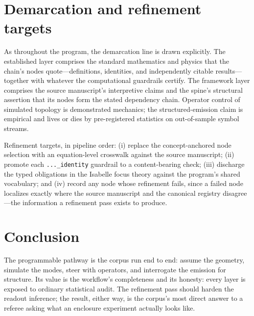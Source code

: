 \documentclass[11pt]{article}
\theoremstyle{remark}
\begin{document}
\section{Demarcation and refinement targets}
\label{sec:demarc}

As throughout the program, the demarcation line is drawn explicitly. The established layer comprises the standard mathematics and physics that the chain's nodes quote---definitions, identities, and independently citable results---together with whatever the computational guardrails certify. The framework layer comprises the source manuscript's interpretive claims and the spine's structural assertion that its nodes form the stated dependency chain. Operator control of simulated topology is demonstrated mechanics; the structured-emission claim is empirical and lives or dies by pre-registered statistics on out-of-sample symbol streams.

Refinement targets, in pipeline order: (i) replace the concept-anchored node selection with an equation-level crosswalk against the source manuscript; (ii) promote each \texttt{...\_identity} guardrail to a content-bearing check; (iii) discharge the typed obligations in the Isabelle focus theory against the program's shared vocabulary; and (iv) record any node whose refinement fails, since a failed node localizes exactly where the source manuscript and the canonical registry disagree---the information a refinement pass exists to produce.

\section{Conclusion}
\label{sec:conc}

The programmable pathway is the corpus run end to end: assume the geometry, simulate the modes, steer with operators, and interrogate the emission for structure. Its value is the workflow's completeness and its honesty: every layer is exposed to ordinary statistical audit. The refinement pass should harden the readout inference; the result, either way, is the corpus's most direct answer to a referee asking what an enclosure experiment actually looks like.
\end{document}
